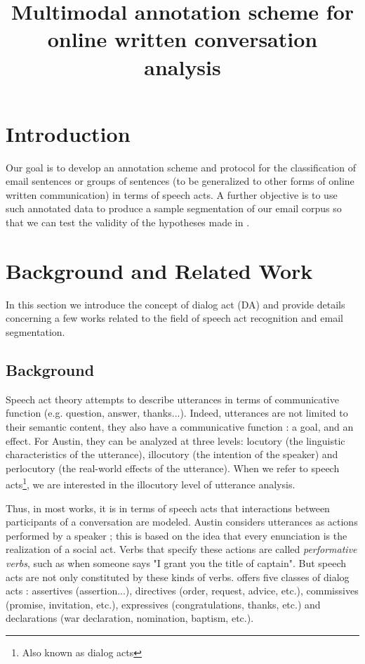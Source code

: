 \documentclass[11pt]{article}
\begin{document}
\title{Multimodal annotation scheme for online written conversation analysis}

\begin{titlepage}

\maketitle

\tableofcontents

\end{titlepage}

\section{Introduction}

Our goal is to develop an annotation scheme and protocol for the classification of email sentences or groups of sentences (to be generalized to other forms of online written communication) in terms of speech acts. A further objective is to use such annotated data to produce a sample segmentation of our email corpus so that we can test the validity of the hypotheses made in \cite{hernandez2014exploiting}.

\section{Background and Related Work}

In this section we introduce the concept of dialog act (DA) and provide details concerning a few works related to the field of speech act recognition and email segmentation.

\subsection{Background}

Speech act theory \cite{austin1975things} attempts to describe utterances in terms of communicative function (e.g. question, answer, thanks...). Indeed, utterances are not limited to their semantic content, they also have a communicative function : a goal, and an effect. For Austin, they can be analyzed at three levels: locutory (the linguistic characteristics of the utterance), illocutory (the intention of the speaker) and perlocutory (the real-world effects of the utterance). When we refer to speech acts\footnote{Also known as dialog acts}, we are interested in the illocutory level of utterance analysis. 

Thus, in most works, it is in terms of speech acts that interactions between participants of a conversation are modeled. Austin considers utterances as actions performed by a speaker ; this is based on the idea that every enunciation is the realization of a social act. Verbs that specify these actions are called \textit{performative verbs}, such as when someone says "I grant you the title of captain". But speech acts are not only constituted by these kinds of verbs. \cite{searle1976taxonomy} offers five classes of dialog acts : assertives (assertion...), directives (order, request, advice, etc.), commissives (promise, invitation, etc.), expressives (congratulations, thanks, etc.) and declarations (war declaration, nomination, baptism, etc.).
\end{document}
